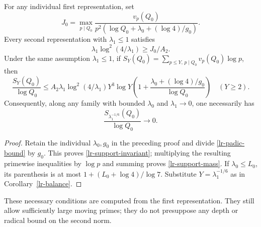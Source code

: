 \begin{corollary}
\label{lr-moving-support}
For any individual first representation, set
\[
 J_0=\max_{p\mid Q_0}
 \frac{v_p(Q_0)}{p^2(\log Q_0+\lambda_0+(\log4)/g_0)}.
\]
Every second representation with $\lambda_1\le1$ satisfies
\begin{equation}\label{lr-support-invariant}
 \lambda_1\log^2(4/\lambda_1)\ge J_0/A_2.
\end{equation}
Under the same assumption $\lambda_1\le1$, if
$S_Y(Q_0)=\sum_{p\le Y,\,p\mid Q_0}v_p(Q_0)\log p$, then
\begin{equation}\label{lr-support-mass}
 \frac{S_Y(Q_0)}{\log Q_0}
 \le A_2\lambda_1\log^2(4/\lambda_1)Y^3\log Y
 \left(1+\frac{\lambda_0+(\log4)/g_0}{\log Q_0}\right)
 \quad(Y\ge2).
\end{equation}
Consequently, along any family with bounded $\lambda_0$ and
$\lambda_1\to0$, one necessarily has
\[
 \frac{S_{\lambda_1^{-1/6}}(Q_0)}{\log Q_0}\longrightarrow0.
\]
\end{corollary}
\begin{proof}
Retain the individual $\lambda_0,g_0$ in the preceding proof and divide
\eqref{lr-padic-bound} by $g_0$. This proves
\eqref{lr-support-invariant}; multiplying the resulting primewise
inequalities by $\log p$ and summing proves \eqref{lr-support-mass}.
If $\lambda_0\le L_0$, its parenthesis is at most
$1+(L_0+\log4)/\log7$. Substitute $Y=\lambda_1^{-1/6}$ as in
Corollary~\ref{lr-balance}.
\end{proof}
These necessary conditions are computed from the first representation.
They still allow sufficiently large moving primes; they do not presuppose
any depth or radical bound on the second norm.

